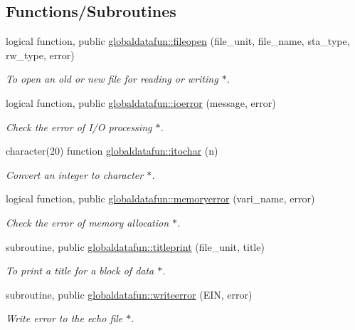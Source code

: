 \subsection*{Functions/\+Subroutines}
\begin{DoxyCompactItemize}
\item 
logical function, public \hyperlink{namespaceglobaldatafun_a384e8e6270f765a8e68a8c65ac8ae9d6}{globaldatafun\+::fileopen} (file\+\_\+unit, file\+\_\+name, sta\+\_\+type, rw\+\_\+type, error)
\begin{DoxyCompactList}\small\item\em To open an old or new file for reading or writing $\ast$. \end{DoxyCompactList}\item 
logical function, public \hyperlink{namespaceglobaldatafun_a84403b06e98cfc25fc1fb6222884a30d}{globaldatafun\+::ioerror} (message, error)
\begin{DoxyCompactList}\small\item\em Check the error of I/O processing $\ast$. \end{DoxyCompactList}\item 
character(20) function \hyperlink{namespaceglobaldatafun_ae970761ddf59b4acff02030b21dbcd75}{globaldatafun\+::itochar} (n)
\begin{DoxyCompactList}\small\item\em Convert an integer to character $\ast$. \end{DoxyCompactList}\item 
logical function, public \hyperlink{namespaceglobaldatafun_af28c2b9df0d5a1ef886c3d242fc15205}{globaldatafun\+::memoryerror} (vari\+\_\+name, error)
\begin{DoxyCompactList}\small\item\em Check the error of memory allocation $\ast$. \end{DoxyCompactList}\item 
subroutine, public \hyperlink{namespaceglobaldatafun_a74b07978d9a6c644031fbb37b131f609}{globaldatafun\+::titleprint} (file\+\_\+unit, title)
\begin{DoxyCompactList}\small\item\em To print a title for a block of data $\ast$. \end{DoxyCompactList}\item 
subroutine, public \hyperlink{namespaceglobaldatafun_ab8bdea863cb470f4098dbfd74bd27faa}{globaldatafun\+::writeerror} (E\+IN, error)
\begin{DoxyCompactList}\small\item\em Write error to the echo file $\ast$. \end{DoxyCompactList}\item 

\end{DoxyCompactItemize}
